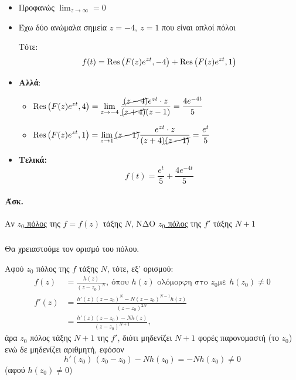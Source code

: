 \documentclass[12pt,a4paper,notitlepage,fleqn]{article}
\begin{document}
    \begin{itemize}
    	\item Προφανώς \( \displaystyle \lim_{z\to \infty} = 0 \)
    	\item Έχω δύο ανώμαλα σημεία \( z=-4,\ z=1 \) που είναι απλοί πόλοι
    	
    	Τότε:
    	\[
    	f(t) = \operatorname{Res}\left(F(z)e^{zt},-4\right) + \operatorname{Res}\left(F(z)e^{zt},1\right)
    	\]
    	
    	\item \textbf{Αλλά}:
    	\begin{itemize}
    		\item \( 
    		\displaystyle
    		\operatorname{Res}\left(F(z)e^{zt},4\right) =
    		\lim_{z\to -4} \frac{\cancel{(z-4)}e^{zt}\cdot z}{\cancel{(z+4)}(z-1)}
    		= \frac{4e^{-4t}}{5}
    		 \)
    		\item \( 
    		\displaystyle
    		\operatorname{Res}\left(F(z)e^{zt},1\right) =
    		\lim_{z\to 1} \cancel{(z-1)} \frac{e^{zt}\cdot z}{(z+4)\cancel{(z-1)}}
    		= \frac{e^t}{5}
    		\)
    	\end{itemize}
    	\item \textbf{Τελικά:}
    	\[
    	f(t) = \frac{e^t}{5} + \frac{4e^{-4t}}{5}
    	\]
    \end{itemize}
    
    \paragraph{Άσκ.}
    Αν \underline{\( z_0 \) πόλος} της \( f=f(z) \) τάξης \( N \),
    ΝΔΟ \underline{\( z_0 \) πόλος} της \( f' \) τάξης \( N+1 \)

    \subparagraph{}
    \begin{attnbox}{}
    	Θα χρειαστούμε τον ορισμό του πόλου.
    \end{attnbox}
    Αφού \( z_0 \) πόλος της \( f \) τάξης \( N \), τότε,
    εξ' ορισμού:
    \begin{align*}
    	f(z) &= \frac{h(z)}{(z-z_0)^N}, \ \text{όπου $h(z)$ ολόμορφη στο $z_0$
    		με $h(z_0) \neq 0$} \\
    	f'(z) &= \frac{h'(z)(z-z_0)^N-N(z-z_0)^{N-1}h(z)}{(z-z_0)^{2N}}
    	\\ &= \frac{h'(z)(z-z_0) - Nh(z)}{(z-z_0)^{N+1}},
    \end{align*}
    άρα \( z_0 \) πόλος τάξης \( N+1 \) της \( f' \), διότι μηδενίζει \( N+1 \) φορές
    παρονομαστή (το \( z_0 \)) ενώ δε μηδενίζει αριθμητή, εφόσον
    \[
    h'(z_0)\, (z_0-z_0) - Nh(z_0) = -Nh(z_0) \neq 0
    \]
    (αφού \( h(z_0) \neq 0 \))
    
\end{document}
